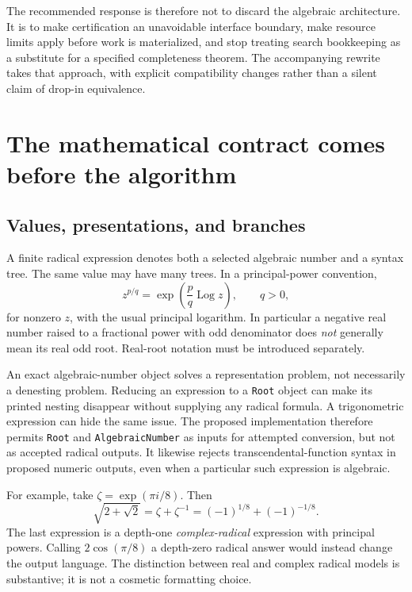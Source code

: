 \documentclass[11pt,letterpaper]{article}
\newcommand{\code}[1]{\texttt{#1}}
\DeclareMathOperator{\Log}{Log}
\theoremstyle{definition}
\begin{document}
The recommended response is therefore not to discard the algebraic architecture. It is to make certification an unavoidable interface boundary, make resource limits apply before work is materialized, and stop treating search bookkeeping as a substitute for a specified completeness theorem. The accompanying rewrite takes that approach, with explicit compatibility changes rather than a silent claim of drop-in equivalence.

\section{The mathematical contract comes before the algorithm}\label{sec:contract}

\subsection{Values, presentations, and branches}

A finite radical expression denotes both a selected algebraic number and a syntax tree. The same value may have many trees. In a principal-power convention,
\[
 z^{p/q}=\exp\!\left(\frac pq\Log z\right),\qquad q>0,
\]
for nonzero $z$, with the usual principal logarithm. In particular a negative real number raised to a fractional power with odd denominator does \emph{not} generally mean its real odd root. Real-root notation must be introduced separately.

An exact algebraic-number object solves a representation problem, not necessarily a denesting problem. Reducing an expression to a \code{Root} object can make its printed nesting disappear without supplying any radical formula. A trigonometric expression can hide the same issue. The proposed implementation therefore permits \code{Root} and \code{AlgebraicNumber} as inputs for attempted conversion, but not as accepted radical outputs. It likewise rejects transcendental-function syntax in proposed numeric outputs, even when a particular such expression is algebraic.

For example, take $\zeta=\exp(\pi i/8)$. Then
\begin{equation}\label{eq:cyclotomic}
 \sqrt{2+\sqrt2}=\zeta+\zeta^{-1}
 =(-1)^{1/8}+(-1)^{-1/8}.
\end{equation}
The last expression is a depth-one \emph{complex-radical} expression with principal powers. Calling $2\cos(\pi/8)$ a depth-zero radical answer would instead change the output language. The distinction between real and complex radical models is substantive; it is not a cosmetic formatting choice.\cite{bfht,gkioulekas}
\end{document}

